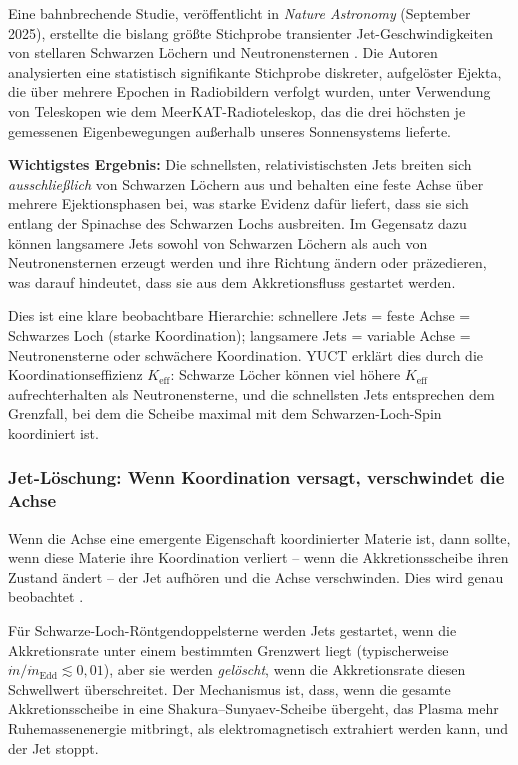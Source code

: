 \documentclass[12pt,a4paper]{article}
\begin{document}
	Eine bahnbrechende Studie, veröffentlicht in \emph{Nature Astronomy} (September 2025), erstellte die bislang größte Stichprobe transienter Jet-Geschwindigkeiten von stellaren Schwarzen Löchern und Neutronensternen \cite{NatureAstronomy2025}. Die Autoren analysierten eine statistisch signifikante Stichprobe diskreter, aufgelöster Ejekta, die über mehrere Epochen in Radiobildern verfolgt wurden, unter Verwendung von Teleskopen wie dem MeerKAT-Radioteleskop, das die drei höchsten je gemessenen Eigenbewegungen außerhalb unseres Sonnensystems lieferte.
	
	\textbf{Wichtigstes Ergebnis:} Die schnellsten, relativistischsten Jets breiten sich \emph{ausschließlich} von Schwarzen Löchern aus und behalten eine feste Achse über mehrere Ejektionsphasen bei, was starke Evidenz dafür liefert, dass sie sich entlang der Spinachse des Schwarzen Lochs ausbreiten. Im Gegensatz dazu können langsamere Jets sowohl von Schwarzen Löchern als auch von Neutronensternen erzeugt werden und ihre Richtung ändern oder präzedieren, was darauf hindeutet, dass sie aus dem Akkretionsfluss gestartet werden.
	
	Dies ist eine klare beobachtbare Hierarchie: schnellere Jets = feste Achse = Schwarzes Loch (starke Koordination); langsamere Jets = variable Achse = Neutronensterne oder schwächere Koordination. YUCT erklärt dies durch die Koordinationseffizienz \(K_{\mathrm{eff}}\): Schwarze Löcher können viel höhere \(K_{\mathrm{eff}}\) aufrechterhalten als Neutronensterne, und die schnellsten Jets entsprechen dem Grenzfall, bei dem die Scheibe maximal mit dem Schwarzen-Loch-Spin koordiniert ist.
	
	\subsubsection{Jet-Löschung: Wenn Koordination versagt, verschwindet die Achse}
	
	Wenn die Achse eine emergente Eigenschaft koordinierter Materie ist, dann sollte, wenn diese Materie ihre Koordination verliert – wenn die Akkretionsscheibe ihren Zustand ändert – der Jet aufhören und die Achse verschwinden. Dies wird genau beobachtet \cite{JetQuenching2006,JetQuenching2018}.
	
	Für Schwarze-Loch-Röntgendoppelsterne werden Jets gestartet, wenn die Akkretionsrate unter einem bestimmten Grenzwert liegt (typischerweise \(\dot{m}/\dot{m}_{\text{Edd}} \lesssim 0,01\)), aber sie werden \emph{gelöscht}, wenn die Akkretionsrate diesen Schwellwert überschreitet. Der Mechanismus ist, dass, wenn die gesamte Akkretionsscheibe in eine Shakura–Sunyaev-Scheibe übergeht, das Plasma mehr Ruhemassenenergie mitbringt, als elektromagnetisch extrahiert werden kann, und der Jet stoppt.
	
\end{document}
